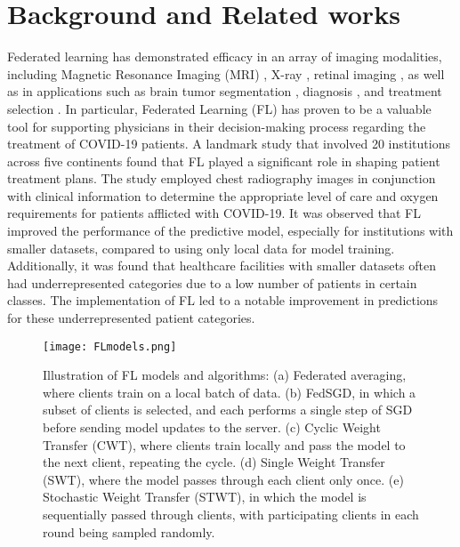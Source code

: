 \section{Background and Related works}

 
Federated learning has demonstrated efficacy in an array of imaging modalities, including Magnetic Resonance Imaging (MRI) \cite{sheller2020federated}\cite{silva2019federated}, X-ray \cite{balachandar2020accounting}, retinal imaging \cite{balachandar2020accounting}, as well as in applications such as brain tumor segmentation \cite{bakas2017advancing}\cite{lee2018privacy}, diagnosis \cite{pan2019improving}, and treatment selection \cite{lee2018privacy}. In particular, Federated Learning (FL) has proven to be a valuable tool for supporting physicians in their decision-making process regarding the treatment of COVID-19 patients. A landmark study that involved 20 institutions across five continents found that FL played a significant role in shaping patient treatment plans\cite{flores2021federated}. The study employed chest radiography images in conjunction with clinical information to determine the appropriate level of care and oxygen requirements for patients afflicted with COVID-19. It was observed that FL improved the performance of the predictive model, especially for institutions with smaller datasets, compared to using only local data for model training. Additionally, it was found that healthcare facilities with smaller datasets often had underrepresented categories due to a low number of patients in certain classes. The implementation of FL led to a notable improvement in predictions for these underrepresented patient categories.

\begin{figure*}[t!]
\centering
\texttt{[image: FLmodels.png]}
\caption{Illustration of FL models and algorithms: (a) Federated averaging, where clients train on a local batch of data. (b) FedSGD, in which a subset of clients is selected, and each performs a single step of SGD before sending model updates to the server. (c) Cyclic Weight Transfer (CWT), where clients train locally and pass the model to the next client, repeating the cycle. (d) Single Weight Transfer (SWT), where the model passes through each client only once. (e) Stochastic Weight Transfer (STWT), in which the model is sequentially passed through clients, with participating clients in each round being sampled randomly.}
\label{fig:flalgorithms}
\end{figure*}


